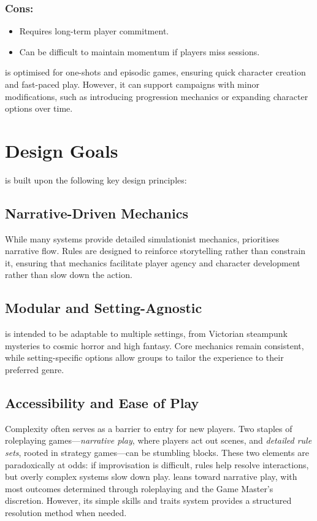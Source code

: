 \subsubsection{Cons:}
\begin{itemize}
    \item Requires long-term player commitment.
    \item Can be difficult to maintain momentum if players miss sessions.
\end{itemize}

\wyrd is optimised for one-shots and episodic games, ensuring quick character creation and fast-paced play. However, it can support campaigns with minor modifications, such as introducing progression mechanics or expanding character options over time.

\section{Design Goals}
\wyrd is built upon the following key design principles:

\subsection{Narrative-Driven Mechanics}
While many systems provide detailed simulationist mechanics, \wyrd prioritises narrative flow. Rules are designed to reinforce storytelling rather than constrain it, ensuring that mechanics facilitate player agency and character development rather than slow down the action.

\subsection{Modular and Setting-Agnostic}
\wyrd is intended to be adaptable to multiple settings, from Victorian steampunk mysteries to cosmic horror and high fantasy. Core mechanics remain consistent, while setting-specific options allow groups to tailor the experience to their preferred genre.

\subsection{Accessibility and Ease of Play}
Complexity often serves as a barrier to entry for new players. Two staples of roleplaying games—\emph{narrative play}, where players act out scenes, and \emph{detailed rule sets}, rooted in strategy games—can be stumbling blocks. These two elements are paradoxically at odds: if improvisation is difficult, rules help resolve interactions, but overly complex systems slow down play. \wyrd leans toward narrative play, with most outcomes determined through roleplaying and the Game Master's discretion. However, its simple skills and traits system provides a structured resolution method when needed.

